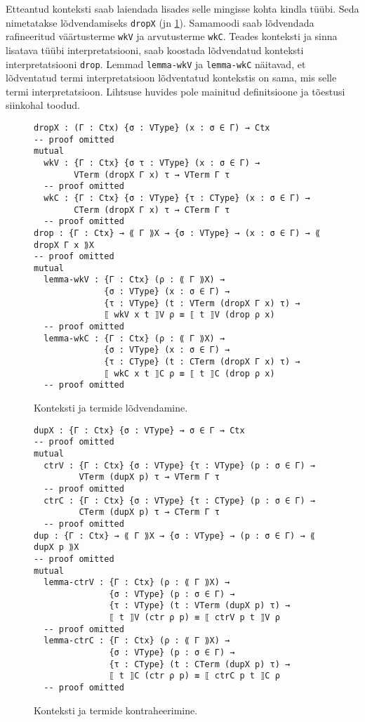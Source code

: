 \documentclass[a4paper,12pt]{article}
\begin{document}
Etteantud konteksti saab laiendada lisades selle mingisse kohta kindla tüübi.
Seda nimetatakse lõdvendamiseks {\tt dropX} (jn \ref{fig:weakening}).
Samamoodi saab lõdvendada rafineeritud väärtusterme {\tt wkV} ja arvutusterme {\tt wkC}.
Teades konteksti ja sinna lisatava tüübi interpretatsiooni, saab koostada lõdvendatud konteksti interpretatsiooni {\tt drop}.
Lemmad {\tt lemma-wkV} ja {\tt lemma-wkC} näitavad, et lõdventatud termi interpretatsioon lõdventatud kontekstis on sama, mis selle termi interpretatsioon.
Lihtsuse huvides pole mainitud definitsioone ja tõestusi siinkohal toodud.
\begin{figure}
  \begin{BVerbatim}
dropX : (Γ : Ctx) {σ : VType} (x : σ ∈ Γ) → Ctx
-- proof omitted
mutual
  wkV : {Γ : Ctx} {σ τ : VType} (x : σ ∈ Γ) →
        VTerm (dropX Γ x) τ → VTerm Γ τ
  -- proof omitted
  wkC : {Γ : Ctx} {σ : VType} {τ : CType} (x : σ ∈ Γ) →
        CTerm (dropX Γ x) τ → CTerm Γ τ
  -- proof omitted
drop : {Γ : Ctx} → ⟪ Γ ⟫X → {σ : VType} → (x : σ ∈ Γ) → ⟪ dropX Γ x ⟫X 
-- proof omitted
mutual
  lemma-wkV : {Γ : Ctx} (ρ : ⟪ Γ ⟫X) →
              {σ : VType} (x : σ ∈ Γ) →
              {τ : VType} (t : VTerm (dropX Γ x) τ) →
              ⟦ wkV x t ⟧V ρ ≡ ⟦ t ⟧V (drop ρ x)
  -- proof omitted
  lemma-wkC : {Γ : Ctx} (ρ : ⟪ Γ ⟫X) →
              {σ : VType} (x : σ ∈ Γ) →
              {τ : CType} (t : CTerm (dropX Γ x) τ) →
              ⟦ wkC x t ⟧C ρ ≡ ⟦ t ⟧C (drop ρ x)
  -- proof omitted
\end{BVerbatim}
  \caption{Konteksti ja termide lõdvendamine.}
  \label{fig:weakening}
\end{figure}

\begin{figure}
  \begin{BVerbatim}
dupX : {Γ : Ctx} {σ : VType} → σ ∈ Γ → Ctx
-- proof omitted
mutual
  ctrV : {Γ : Ctx} {σ : VType} {τ : VType} (p : σ ∈ Γ) →
         VTerm (dupX p) τ → VTerm Γ τ
  -- proof omitted
  ctrC : {Γ : Ctx} {σ : VType} {τ : CType} (p : σ ∈ Γ) →
         CTerm (dupX p) τ → CTerm Γ τ
  -- proof omitted
dup : {Γ : Ctx} → ⟪ Γ ⟫X → {σ : VType} → (p : σ ∈ Γ) → ⟪ dupX p ⟫X
-- proof omitted
mutual
  lemma-ctrV : {Γ : Ctx} (ρ : ⟪ Γ ⟫X) →
               {σ : VType} (p : σ ∈ Γ) →
               {τ : VType} (t : VTerm (dupX p) τ) →
               ⟦ t ⟧V (ctr ρ p) ≡ ⟦ ctrV p t ⟧V ρ
  -- proof omitted
  lemma-ctrC : {Γ : Ctx} (ρ : ⟪ Γ ⟫X) →
               {σ : VType} (p : σ ∈ Γ) →
               {τ : CType} (t : CTerm (dupX p) τ) →
               ⟦ t ⟧C (ctr ρ p) ≡ ⟦ ctrC p t ⟧C ρ
  -- proof omitted
  \end{BVerbatim}
  \caption{Konteksti ja termide kontraheerimine.}
  \label{fig:contraction}
\end{figure}
\end{document}
